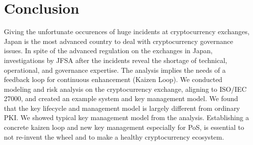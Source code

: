\section{Conclusion}
Giving the unfortunate occurences of huge incidents at cryptocurrency exchanges, Japan is the most advanced country to deal with cryptocurrency governance issues. In spite of the advanced regulation on the exchanges in Japan, investigations by JFSA after the incidents reveal the shortage of technical, operational, and governance expertise.
The analysis implies the needs of a feedback loop for continuous enhancement (Kaizen Loop). We conducted modeling and risk analysis on the cryptocurrency exchange, aligning to ISO/IEC 27000, and created an example system and key management model. We found that the key lifecycle and management model is largely different from ordinary PKI. We showed typical key management model from the analysis. Establishing a concrete kaizen loop and new key management especially for PoS, is essential to not re-invent the wheel and to make a healthy cryptocurrency ecosystem.
